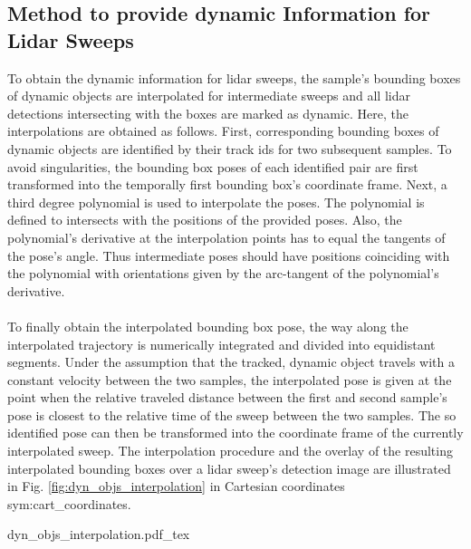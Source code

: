 \subsection{Method to provide dynamic Information for Lidar Sweeps}
\label{subsec:method_dyn_info_for_lidar}
To obtain the dynamic information for lidar sweeps, the sample's bounding boxes of dynamic objects are interpolated for intermediate sweeps and all lidar detections intersecting with the boxes are marked as dynamic. Here, the interpolations are obtained as follows. First, corresponding bounding boxes of dynamic objects are identified by their track ids for two subsequent samples. To avoid singularities, the bounding box poses of each identified pair are first transformed into the temporally first bounding box's coordinate frame. Next, a third degree polynomial is used to interpolate the poses. The polynomial is defined to intersects with the positions of the provided poses. Also, the polynomial's derivative at the interpolation points has to equal the tangents of the pose's angle. Thus intermediate poses should have  positions coinciding with the polynomial with orientations given by the arc-tangent of the polynomial's derivative.
\\\\
To finally obtain the interpolated bounding box pose, the way along the interpolated trajectory is numerically integrated and divided into equidistant segments. Under the assumption that the tracked, dynamic object travels with a constant velocity between the two samples, the interpolated pose is given at the point when the relative traveled distance between the first and second sample's pose is closest to the relative time of the sweep between the two samples. The so identified pose can then be transformed into the coordinate frame of the currently interpolated sweep. The interpolation procedure and the overlay of the resulting interpolated bounding boxes over a lidar sweep's detection image are illustrated in Fig. \ref{fig:dyn_objs_interpolation} in Cartesian coordinates \gls{sym:cart_coordinates}.
\begin{center}
	{dyn_objs_interpolation.pdf_tex}
\end{center}
%
